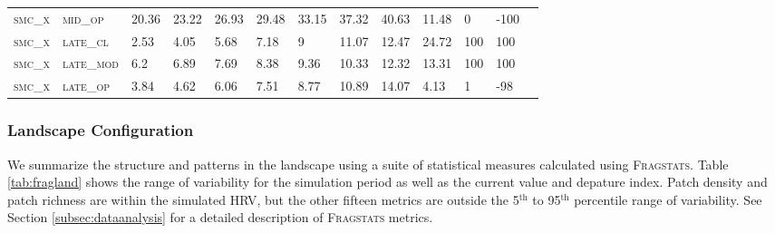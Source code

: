 \begin{sidewaystable}[!htbp]
\begin{tabular}{@{}lllllllllllll@{}}
\footnotesize \textsc{smc\_x}      & \footnotesize \textsc{mid\_op   }     & \footnotesize 20.36           & \footnotesize 23.22           & \footnotesize 26.93            & \footnotesize 29.48            & \footnotesize 33.15            & \footnotesize 37.32            & \footnotesize 40.63         & \footnotesize 11.48    & \footnotesize 0      & \footnotesize -100     \\
\footnotesize \textsc{smc\_x}      & \footnotesize \textsc{late\_cl  }     & \footnotesize 2.53            & \footnotesize 4.05            & \footnotesize 5.68             & \footnotesize 7.18             & \footnotesize 9                & \footnotesize 11.07            & \footnotesize 12.47         & \footnotesize 24.72    & \footnotesize 100    & \footnotesize 100      \\
\footnotesize \textsc{smc\_x}      & \footnotesize \textsc{late\_mod }     & \footnotesize 6.2             & \footnotesize 6.89            & \footnotesize 7.69             & \footnotesize 8.38             & \footnotesize 9.36             & \footnotesize 10.33            & \footnotesize 12.32         & \footnotesize 13.31    & \footnotesize 100    & \footnotesize 100      \\
\footnotesize \textsc{smc\_x}      & \footnotesize \textsc{late\_op  }     & \footnotesize 3.84            & \footnotesize 4.62            & \footnotesize 6.06             & \footnotesize 7.51             & \footnotesize 8.77             & \footnotesize 10.89            & \footnotesize 14.07         & \footnotesize 4.13     & \footnotesize 1      & \footnotesize -98      \\ \bottomrule 
\end{tabular}
\end{sidewaystable}



\clearpage
\pagebreak[4]
\subsubsection{Landscape Configuration}
We summarize the structure and patterns in the landscape using a suite of statistical measures calculated using \textsc{Fragstats}. Table \ref{tab:fragland} shows the range of variability for the simulation period as well as the current value and depature index. Patch density and patch richness are within the simulated HRV, but the other fifteen metrics are outside the 5$^{\text{th}}$ to 95$^{\text{th}}$ percentile range of variability. See Section \ref{subsec:dataanalysis} for a detailed description of \textsc{Fragstats} metrics.

